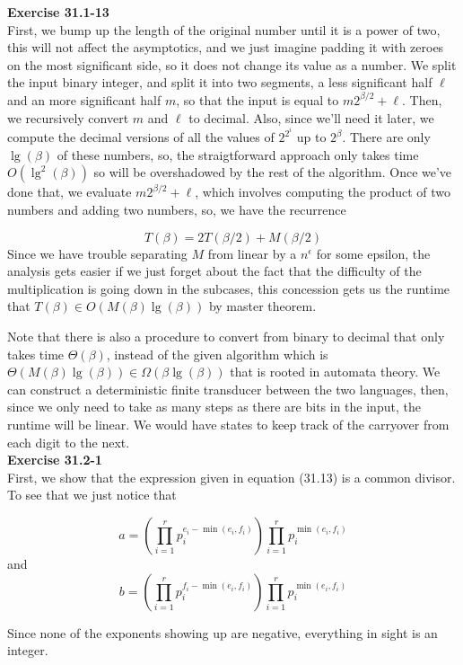 \documentclass{article}
\begin{document}
\noindent\textbf{Exercise 31.1-13}\\

First, we bump up the length of the original number until it is a power of two, this will not affect the asymptotics, and we just imagine padding it with zeroes on the most significant side, so it does not change its value as a number. We split the input binary integer, and split it into two segments, a less significant half $\ell$ and an more significant half $m$, so that the input is equal to $m2^{\beta/2} + \ell$. Then, we recursively convert $m$ and $\ell$ to decimal. Also, since we'll need it later, we compute the decimal versions of all the values of $2^{2^i}$ up to $2^{\beta}$. There are only $\lg(\beta)$ of these numbers, so, the straigtforward approach only takes time $O(\lg^2(\beta))$ so will be overshadowed by the rest of the algorithm. Once we've done that, we evaluate $m2^{\beta/2} + \ell$, which involves computing the product of two numbers and adding two numbers, so, we have the recurrence

\[
T( \beta) = 2T(\beta/2) + M(\beta/2)
\]
Since we have trouble separating $M$ from linear by a $n^{\epsilon}$ for some epsilon, the analysis gets easier if we just forget about the fact that the difficulty of the multiplication is going down in the subcases, this concession gets us the runtime that $T(\beta) \in O(M(\beta) \lg(\beta))$ by master theorem.

Note that there is also a procedure to convert from binary to decimal that only takes time $\Theta(\beta)$, instead of the given algorithm which is $\Theta(M(\beta)\lg(\beta)) \in \Omega(\beta \lg(\beta))$ that is rooted in automata theory. We can construct a deterministic finite transducer between the two languages, then, since we only need to take as many steps as there are bits in the input, the runtime will be linear. We would have states to keep track of the carryover from each digit to the next.\\

\noindent\textbf{Exercise 31.2-1}\\

First, we show that the expression given in equation (31.13) is a common divisor. To see that we just notice that 

\[
a = (\prod_{i=1}^r p_i^{e_i-\min(e_i,f_i)})\prod_{i=1}^r p_i^{\min(e_i,f_i)}
\]
and 
\[
b = (\prod_{i=1}^r p_i^{f_i-\min(e_i,f_i)})\prod_{i=1}^r p_i^{\min(e_i,f_i)}
\]

Since none of the exponents showing up are negative, everything in sight is an integer.
\end{document}
